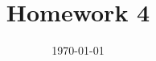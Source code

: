 




\documentclass[11pt, a4paper, UTF8]{ctexart}
\usepackage{tikz}
\usetikzlibrary{shapes.geometric, arrows}



\title{Homework 4}
\date{\today}


\thispagestyle{empty}
\maketitle

